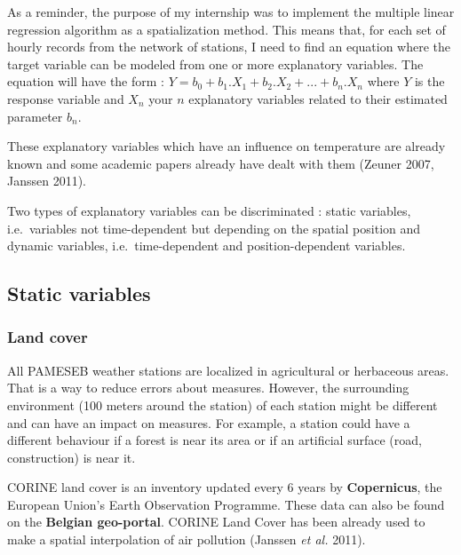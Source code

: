 \documentclass[12pt,twoside]{reedthesis}
\theoremstyle{definition}
\theoremstyle{definition}
\theoremstyle{definition}
\theoremstyle{remark}
\begin{document}
As a reminder, the purpose of my internship was to implement the
multiple linear regression algorithm as a spatialization method. This
means that, for each set of hourly records from the network of stations,
I need to find an equation where the target variable can be modeled from
one or more explanatory variables. The equation will have the form :
\(Y = b_0 + b_1.X_1 + b_2.X_2 + ... + b_n.X_n\) where \(Y\) is the
response variable and \(X_n\) your \(n\) explanatory variables related
to their estimated parameter \(b_n\).

These explanatory variables which have an influence on temperature are
already known and some academic papers already have dealt with them
(Zeuner 2007, Janssen 2011).

Two types of explanatory variables can be discriminated : static
variables, i.e.~variables not time-dependent but depending on the
spatial position and dynamic variables, i.e.~time-dependent and
position-dependent variables.

\subsection{Static variables}\label{static-variables}

\subsubsection{Land cover}\label{land-cover}

All PAMESEB weather stations are localized in agricultural or herbaceous
areas. That is a way to reduce errors about measures. However, the
surrounding environment (100 meters around the station) of each station
might be different and can have an impact on measures. For example, a
station could have a different behaviour if a forest is near its area or
if an artificial surface (road, construction) is near it.

CORINE land cover is an inventory updated every 6 years by
\textbf{Copernicus}, the European Union's Earth Observation Programme.
These data can also be found on the \textbf{Belgian geo-portal}. CORINE
Land Cover has been already used to make a spatial interpolation of air
pollution (Janssen \emph{et al.} 2011).
\end{document}
